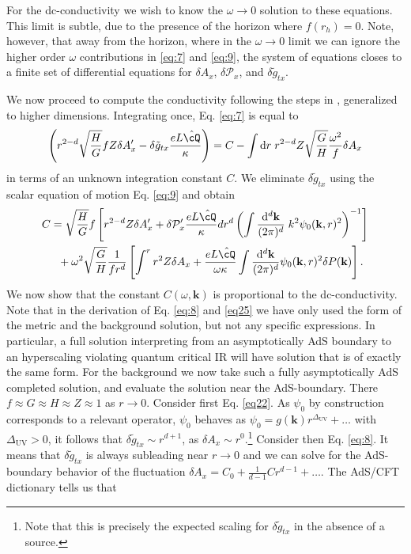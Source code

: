 \documentclass[10pt, oneside]{book}
\begin{document}
\begin{doublespace}
For the dc-conductivity we wish to know the $\omega \rightarrow 0$ solution to these equations. This limit is subtle, due to the presence of the horizon where $f(r_h)=0$. Note, however, that away from the horizon, where in the $\omega \rightarrow 0$ limit we can ignore the higher order $\omega$ contributions in \eqref{eq:7} and \eqref{eq:9},
the system of equations closes to a finite set of differential equations for $\delta A_x$, $\delta\mathcal{P}_x$, and $\delta \tilde{g}_{tx}$. 

We now proceed to compute the conductivity following the steps in  \cite{Blake:2013bqa}, generalized to higher dimensions.   
Integrating once, Eq. \eqref{eq:7} is equal to
\begin{align}
  \label{eq:8}
  \left( r^{2-d}\sqrt{\frac{H}{G}}fZ\delta A_x^\prime  -  \delta \tilde{g}_{tx} \frac{eL\hat{\cQ}}{\kappa}\right) = C -\int\mathrm{d}r \; r^{2-d}Z\sqrt{\frac{G}{H}} \frac{\omega^2}{f} \delta A_x 
\end{align}
in terms of an unknown integration constant $C$. We eliminate $\delta\tilde{g}_{tx}$ using the scalar equation of motion Eq. \eqref{eq:9} and obtain 
\begin{align}
C &=\sqrt{\frac{H}{G}} f \left[ r^{2-d}Z\delta A_x^\prime  + {\delta \mathcal{P}_x^\prime} \frac{eL\hat{\cQ}}{\kappa} dr^d \left(\int \frac{\mathrm{d}^d\mathbf{k}}{(2\pi)^d}\; k^2 \psi_0(\mathbf{k},r)^2\right)^{-1}\right] \nonumber\\
&~~ +\omega^2\sqrt{\frac{G}{H}} \frac{1}{fr ^d}\left[\int^r r^{2}Z \delta A_x +\frac{eL\hat{\cQ}}{\omega \kappa}  \int \frac{\mathrm{d}^d \mathbf{k}}{(2\pi)^d} \psi_0(\mathbf{k},r)^2 \delta P(\mathbf{k}) \right].
\label{eq25}
\end{align} 
We now show that the constant $C(\omega, \mathbf{k})$ is proportional to the dc-conductivity.
Note that in the derivation of Eq. \eqref{eq:8} and \eqref{eq25} we have only used the form of the metric and the background solution, but not any specific expressions. In particular, a full solution interpreting from an asymptotically AdS boundary to an hyperscaling violating quantum critical IR will have solution that is of exactly the same form. For the background we now take such a fully asymptotically AdS completed solution, and evaluate the solution near the AdS-boundary. There $f\approx G\approx H\approx Z\approx 1$ as $r\rightarrow 0$. Consider first Eq. \eqref{eq22}. As $\psi_0$ by construction corresponds to a relevant operator,  $\psi_0$ behaves as $\psi_0= g(\mathbf{k}) r^{\Delta_{\mathrm{UV}}}+\ldots$ with $\Delta_{\mathrm{UV}} >0$, it follows that $\delta\tilde{g}_{tx} \sim r^{d+1}$, as $\delta A_x \sim r^{0}$.\footnote{Note that this is precisely the expected scaling for $\delta \tilde{g}_{tx}$ in the absence of a source.} Consider then Eq. \eqref{eq:8}. It means that $\delta\tilde{g}_{tx}$ is always subleading near $r\rightarrow 0$ and we can solve for the AdS-boundary behavior of the fluctuation $\delta A_x =  C_0+\frac{1}{d-1}C r^{d-1}+\ldots$. The AdS/CFT dictionary tells us that

\end{doublespace}
\end{document}
